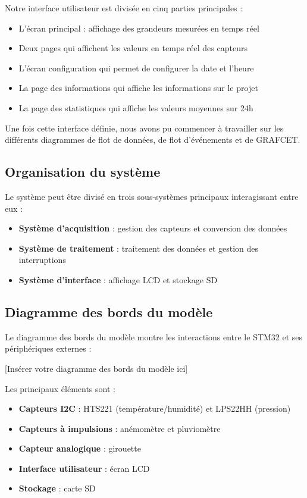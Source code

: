 \documentclass[12pt]{article}
\begin{document}
Notre interface utilisateur est divisée en cinq parties principales :
\begin{itemize}
    \item L'écran principal : affichage des grandeurs mesurées en temps réel
    \item Deux pages qui affichent les valeurs en temps réel des capteurs
    \item L'écran configuration qui permet de configurer la date et l'heure
    \item La page des informations qui affiche les informations sur le projet
    \item La page des statistiques qui affiche les valeurs moyennes sur 24h
\end{itemize}

Une fois cette interface définie, nous avons pu commencer à travailler sur les différents diagrammes de flot de données, de flot d'événements et de GRAFCET.
\subsection{Organisation du système}
Le système peut être divisé en trois sous-systèmes principaux interagissant entre eux :
\begin{itemize}
    \item \textbf{Système d'acquisition} : gestion des capteurs et conversion des données
    \item \textbf{Système de traitement} : traitement des données et gestion des interruptions
    \item \textbf{Système d'interface} : affichage LCD et stockage SD
\end{itemize}

\subsection{Diagramme des bords du modèle}
Le diagramme des bords du modèle montre les interactions entre le STM32 et ses périphériques externes :

[Insérer votre diagramme des bords du modèle ici]

Les principaux éléments sont :
\begin{itemize}
    \item \textbf{Capteurs I2C} : HTS221 (température/humidité) et LPS22HH (pression)
    \item \textbf{Capteurs à impulsions} : anémomètre et pluviomètre
    \item \textbf{Capteur analogique} : girouette
    \item \textbf{Interface utilisateur} : écran LCD
    \item \textbf{Stockage} : carte SD
\end{itemize}
\end{document}
